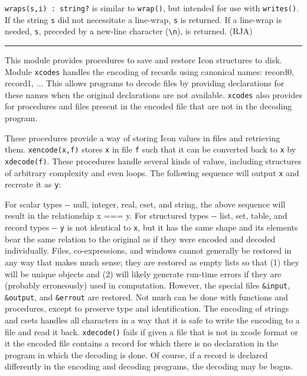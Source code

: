 \texttt{wraps(s,i) : string?} is similar to \texttt{wrap()}, but
intended for use with \texttt{writes()}. If the string \texttt{s} did
not necessitate a line-wrap, \texttt{s} is returned. If a line-wrap is
needed, \texttt{s}, preceded by a new-line character
(\texttt{{\textquotedbl}{\textbackslash}n{\textquotedbl}}), is
returned. (RJA)

\vspace{0.25cm}\hrule{}

This module provides procedures to save and restore Icon structures to
disk. Module \texttt{xcodes} handles the encoding of
records using canonical names: record0, record1, ... This allows
programs to decode files by providing declarations for these names when
the original declarations are not available. \texttt{xcodes} also
provides for procedures and files present in the encoded file that are
not in the decoding program.

These procedures provide a way of storing Icon values in files and
retrieving them. \texttt{xencode(x,f)} stores \texttt{x} in file
\texttt{f} such that it can be converted back to \texttt{x} by
\texttt{xdecode(f)}. These procedures handle several kinds of values,
including structures of arbitrary complexity and even loops. The
following sequence will output \texttt{x} and recreate it as
\texttt{y}:


For {\textquotedbl}scalar{\textquotedbl} types -{}- null, integer, real,
cset, and string, the above sequence will result in the relationship x
=== y. For structured types -{}- list, set, table, and record types
-{}- \texttt{y} is not identical to \texttt{x}, but it has the same
{\textquotedbl}shape{\textquotedbl} and its elements bear the same
relation to the original as if they were encoded and decoded
individually. Files, co-expressions, and windows cannot generally be
restored in any way that makes much sense; they are restored as empty
lists so that (1) they will be unique objects and (2) will likely
generate run-time errors if they are (probably
erroneously) used in computation. However, the special files
\texttt{\&input}, \texttt{\&output}, and \texttt{\&errout} are
restored. Not much can be done with functions and procedures, except to
preserve type and identification. The encoding of strings and csets
handles all characters in a way that it is safe to write the encoding
to a file and read it back. \texttt{xdecode()} fails if given a file
that is not in xcode format or it the encoded file contains a record
for which there is no declaration in the program in which the decoding
is done. Of course, if a record is declared differently in the encoding
and decoding programs, the decoding may be bogus.

